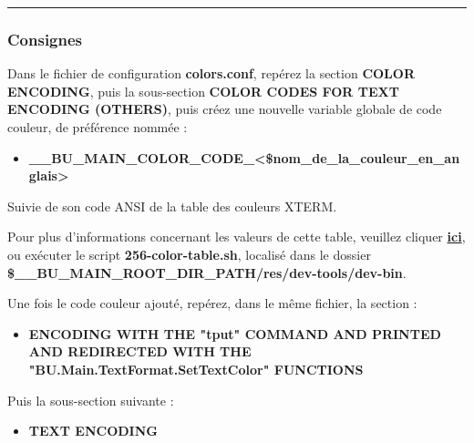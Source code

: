 \documentclass[a4paper,10pt]{article}
\begin{document}

\color{sec3}\par\noindent\rule{\textwidth}{0.4pt}\color{text}

\color{sec3}
\subsubsection{Consignes}\color{text}

\begin{justify}
    Dans le fichier de configuration \textbf{\color{path}colors.conf}, repérez la section \textbf{COLOR ENCODING}, puis la sous-section \textbf{COLOR CODES FOR TEXT ENCODING (OTHERS)}, puis créez une nouvelle variable globale de code couleur, de préférence nommée :

    \begin{itemize}
        \item \textbf{\color{vars}\_\_BU\_MAIN\_COLOR\_CODE\_<\$nom\_de\_la\_couleur\_en\_anglais>}
    \end{itemize}
\end{justify}

\begin{justify}
    Suivie de son code ANSI de la table des couleurs XTERM.
\end{justify}

\begin{justify}
    Pour plus d'informations concernant les valeurs de cette table, veuillez cliquer \href{https://unix.stackexchange.com/questions/269077/tput-setaf-color-table-how-to-determine-color-codes/269085#269085}{\textbf{ici}}, ou exécuter le script \textbf{\color{path}256-color-table.sh}, localisé dans le dossier \textbf{\color{vars}\$\_\_BU\_MAIN\_ROOT\_DIR\_PATH\color{path}/res/dev-tools/dev-bin}.
\end{justify}

\begin{justify}
    Une fois le code couleur ajouté, repérez, dans le même fichier, la section :

    \begin{itemize}
        \item \textbf{ENCODING WITH THE "tput" COMMAND AND PRINTED AND REDIRECTED WITH THE\\ "BU.Main.TextFormat.SetTextColor" FUNCTIONS}
    \end{itemize}
\end{justify}

\begin{justify}
    Puis la sous-section suivante :

    \begin{itemize}
        \item \textbf{TEXT ENCODING}
    \end{itemize}
\end{justify}
\end{document}
